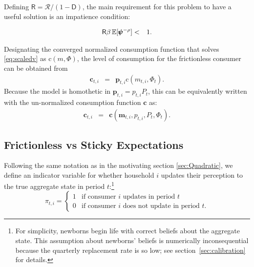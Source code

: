 \documentclass[titlepage]{./econtex}
\begin{document}
Defining $\mathsf{R} = \mathscr{R}\big/(1-\mathsf{D})$, the main requirement for this problem to have a useful solution is an impatience condition: 

\begin{eqnarray*}
  \label{eq:impatience}
  \mathsf{R} \beta  \operatorname{\mathbb{E}}[ \pmb{\psi}^{-\rho}]  & < & 1.
\end{eqnarray*}
 
Designating the converged normalized consumption function that solves \eqref{eq:scaledv} as
$\mathrm{c}(m,\Phi)$, the level of consumption for the frictionless consumer can be obtained from
\begin{eqnarray}
  \label{eq:cFlevel}
   \mathbf{c}_{t,i} & = & \pmb{p}_{t,i} \mathrm{c}(m_{t,i},\Phi_t)  \nonumber
.
\end{eqnarray}
 Because the model is homothetic in $\pmb{p}_{t,i}={p}_{t,i} {P}_{t}$, this can be equivalently written with the un-normalized consumption function $\textbf{c}$ as:
\begin{eqnarray*}
\mathbf{c}_{t,i} & = & \textbf{c}(\mathbf{m}_{t,i}, p_{t,i}, {P}_t, {\Phi}_t).
\end{eqnarray*}


\subsection{Frictionless vs Sticky Expectations}\label{sec:StickySOE}

Following the same notation as in the motivating section \ref{sec:Quadratic}, we define an indicator variable for whether household $i$ updates their perception to the true aggregate state in period $t$:\footnote{For simplicity, newborns begin life with correct beliefs about the aggregate state.  This assumption about newborns' beliefs is numerically inconsequential because the quarterly replacement rate is so low; see section~\ref{sec:calibration} for details.}
\begin{equation*}
\pi_{t,i} =
\begin{cases}
   1 & \text{if consumer $i$ updates in period $t$}
\\ 0 & \text{if consumer $i$ does not update in period $t$}.
\end{cases}
\end{equation*}
\end{document}
